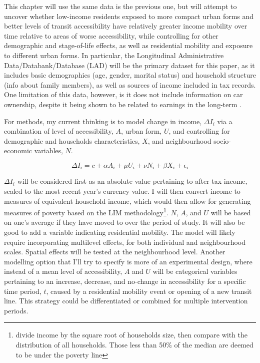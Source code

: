 This chapter will use the same data is the previous one, but will attempt to uncover whether low-income residents exposed to more compact urban forms and better levels of transit accessibility have relatively greater income mobility over time relative to areas of worse accessibility, while controlling for other demographic and stage-of-life effects, as well as residential mobility and exposure to different urban forms. In particular, the Longitudinal Administrative Data/Databank/Database (LAD) will be the primary dataset for this paper, as it includes basic demographics (age, gender, marital status) and household structure (info about family members), as well as sources of income included in tax records. One limitation of this data, however, is it does not include information on car ownership, despite it being shown to be related to earnings in the long-term \cite{smart_disentangling_2020}.

For methods, my current thinking is to model change in income, $\Delta I_i$ via a combination of level of accessibility, $A$, urban form, $U$, and controlling for demographic and households characteristics, $X$, and neighbourhood socio-economic variables, $N$.

\[
\Delta I_i = c + \alpha A_i + \mu U_i + \nu N_i + \beta X_i + \epsilon_i
\]

$\Delta I_i$ will be considered first as an absolute value pertaining to after-tax income, scaled to the most recent year's currency value. I will then convert income to measures of equivalent household income, which would then allow for generating measures of poverty based on the LIM methodology\footnote{divide income by the square root of households size, then compare with the distribution of all households. Those less than 50\% of the median are deemed to be under the poverty line}. 
$N$, $A$, and $U$ will be based on one's average if they have moved to over the period of study. It will also be good to add a variable indicating residential mobility. The model will likely require incorporating multilevel effects, for both individual and neighbourhood scales. Spatial effects will be tested at the neighbourhood level. Another modelling option that I'll try to specify is more of an experimental design, where instead of a mean level of accessibility, $A$ and $U$ will be categorical variables pertaining to an increase, decrease, and no-change in accessibility for a specific time period, $t$, caused by a residential mobility event or opening of a new transit line. This strategy could be differentiated or combined for multiple intervention periods.

